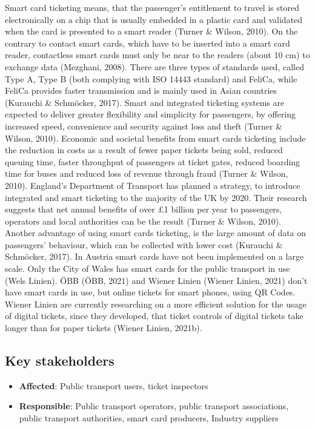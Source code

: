 \documentclass[
]{book}
\providecommand{\tightlist}{%
  \setlength{\itemsep}{0pt}\setlength{\parskip}{0pt}}
\begin{document}
Smart card ticketing means, that the passenger's entitlement to travel is stored electronically on a chip that is usually embedded in a plastic card and validated when the card is presented to a smart reader (Turner \& Wilson, 2010). On the contrary to contact smart cards, which have to be inserted into a smart card reader, contactless smart cards must only be near to the readers (about 10 cm) to exchange data (Mezghani, 2008). There are three types of standards used, called Type A, Type B (both complying with ISO 14443 standard) and FeliCa, while FeliCa provides faster transmission and is mainly used in Asian countries (Kurauchi \& Schmöcker, 2017).
Smart and integrated ticketing systems are expected to deliver greater flexibility and simplicity for passengers, by offering increased speed, convenience and security against loss and theft (Turner \& Wilson, 2010). Economic and societal benefits from smart cards ticketing include the reduction in costs as a result of fewer paper tickets being sold, reduced queuing time, faster throughput of passengers at ticket gates, reduced boarding time for buses and reduced loss of revenue through fraud (Turner \& Wilson, 2010).
England's Department of Transport has planned a strategy, to introduce integrated and smart ticketing to the majority of the UK by 2020. Their research suggests that net annual benefits of over £1 billion per year to passengers, operators and local authorities can be the result (Turner \& Wilson, 2010).
Another advantage of using smart cards ticketing, is the large amount of data on passengers' behaviour, which can be collected with lower cost (Kurauchi \& Schmöcker, 2017). In Austria smart cards have not been implemented on a large scale. Only the City of Wales has smart cards for the public transport in use (Wels Linien). ÖBB (ÖBB, 2021) and Wiener Linien (Wiener Linien, 2021) don't have smart cards in use, but online tickets for smart phones, using QR Codes. Wiener Linien are currently researching on a more efficient solution for the usage of digital tickets, since they developed, that ticket controls of digital tickets take longer than for paper tickets (Wiener Linien, 2021b).

\hypertarget{key-stakeholders-4}{%
\subsection*{Key stakeholders}\label{key-stakeholders-4}}

\begin{itemize}
\tightlist
\item
  \textbf{Affected}: Public transport users, ticket inspectors
\item
  \textbf{Responsible}: Public transport operators, public transport associations, public transport authorities, smart card producers, Industry suppliers
\end{itemize}
\end{document}
